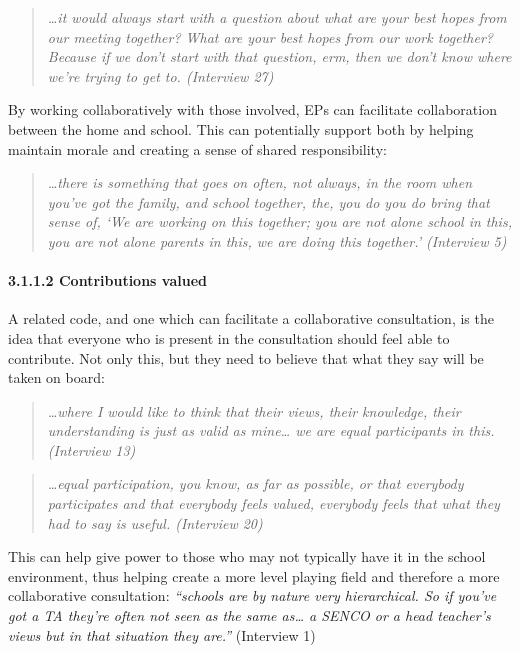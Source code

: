 \documentclass[
]{article}
\begin{document}
\begin{quote}
\emph{\ldots it would always start with a question about what are your
best hopes from our meeting together? What are your best hopes from our
work together? Because if we don't start with that question, erm, then
we don't know where we're trying to get to. (Interview 27)}
\end{quote}

By working collaboratively with those involved, EPs can facilitate
collaboration between the home and school. This can potentially support
both by helping maintain morale and creating a sense of shared
responsibility:

\begin{quote}
\emph{\ldots there is something that goes on often, not always, in the
room when you've got the family, and school together, the, you do you do
bring that sense of, `We are working on this together; you are not alone
school in this, you are not alone parents in this, we are doing this
together.' (Interview 5)}
\end{quote}

\hypertarget{contributions-valued}{%
\paragraph{3.1.1.2 Contributions valued}\label{contributions-valued}}

A related code, and one which can facilitate a collaborative
consultation, is the idea that everyone who is present in the
consultation should feel able to contribute. Not only this, but they
need to believe that what they say will be taken on board:

\begin{quote}
\emph{\ldots where I would like to think that their views, their
knowledge, their understanding is just as valid as mine\ldots{} we are
equal participants in this. (Interview 13)}
\end{quote}

\begin{quote}
\emph{\ldots equal participation, you know, as far as possible, or that
everybody participates and that everybody feels valued, everybody feels
that what they had to say is useful. (Interview 20)}
\end{quote}

This can help give power to those who may not typically have it in the
school environment, thus helping create a more level playing field and
therefore a more collaborative consultation: \emph{``schools are by
nature very hierarchical. So if you've got a TA they're often not seen
as the same as\ldots{} a SENCO or a head teacher's views but in that
situation they are.''} (Interview 1)
\end{document}
